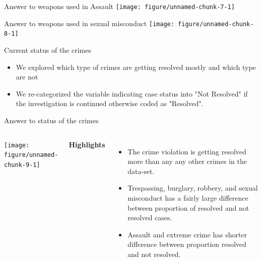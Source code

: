 \documentclass{beamer}\usepackage[]{graphicx}\usepackage[]{xcolor}
\newenvironment{knitrout}{}{} %
\begin{document}
\begin{frame}[fragile]{Answer to weapons used in Assault}
\begin{knitrout}
\color{fgcolor}
\texttt{[image: figure/unnamed-chunk-7-1]} 
\end{knitrout}



\end{frame}


\begin{frame}[fragile]{Answer to weapons used in sexual misconduct}
\begin{knitrout}
\color{fgcolor}
\texttt{[image: figure/unnamed-chunk-8-1]} 
\end{knitrout}
\end{frame}


\begin{frame}[fragile]{Current status of the crimes}


\begin{itemize}
\item We explored which type of crimes are getting resolved mostly and which type are not

\item We re-categorized the variable indicating case status into "Not Resolved" if the investigation is continued otherwise coded as "Resolved".
\end{itemize}
\end{frame}



\begin{frame}[fragile]{Answer to status of the crimes}
\begin{columns}
\begin{knitrout}
\color{fgcolor}
\texttt{[image: figure/unnamed-chunk-9-1]} 
\end{knitrout}

\textbf{Highlights}
\begin{itemize}
\item The crime violation is getting resolved more than any any other crimes in the data-set.
\item Trespassing, burglary, robbery, and sexual misconduct has a fairly large difference between proportion of resolved and not resolved cases. 
\item Assault and extreme crime has shorter difference between proportion resolved and not resolved.

\end{itemize}

\end{columns}
\end{frame} 
\end{document}
